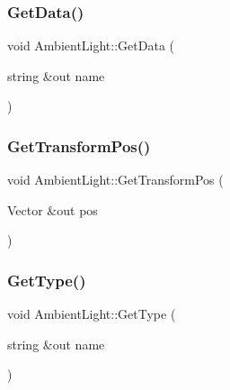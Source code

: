 \hypertarget{class_ambient_light_a6154ec53922a92ec489b5c61f812d5db}{}\label{class_ambient_light_a6154ec53922a92ec489b5c61f812d5db} 
\subsubsection{\texorpdfstring{Get\+Data()}{GetData()}}
{\footnotesize\ttfamily void Ambient\+Light\+::\+Get\+Data (\begin{DoxyParamCaption}\item[{string \&out}]{name }\end{DoxyParamCaption})}

\hypertarget{class_ambient_light_a1b393744bae63464d6f105f915a011b4}{}\label{class_ambient_light_a1b393744bae63464d6f105f915a011b4} 
\subsubsection{\texorpdfstring{Get\+Transform\+Pos()}{GetTransformPos()}}
{\footnotesize\ttfamily void Ambient\+Light\+::\+Get\+Transform\+Pos (\begin{DoxyParamCaption}\item[{Vector \&out}]{pos }\end{DoxyParamCaption})}

\hypertarget{class_ambient_light_a9de05c7b1c46ed7a1474e212aa89712d}{}\label{class_ambient_light_a9de05c7b1c46ed7a1474e212aa89712d} 
\subsubsection{\texorpdfstring{Get\+Type()}{GetType()}}
{\footnotesize\ttfamily void Ambient\+Light\+::\+Get\+Type (\begin{DoxyParamCaption}\item[{string \&out}]{name }\end{DoxyParamCaption})}

\hypertarget{class_ambient_light_a3edb529d1adde69104ca30724f55f3ca}{}\label{class_ambient_light_a3edb529d1adde69104ca30724f55f3ca} 
